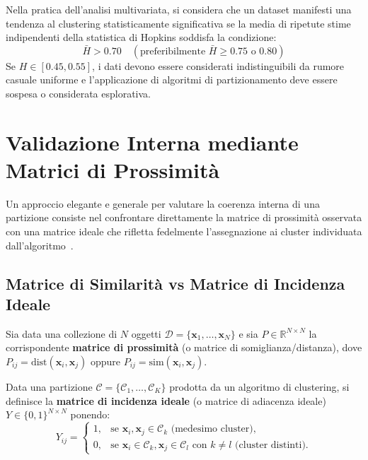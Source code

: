 \begin{remark}
Nella pratica dell'analisi multivariata, si considera che un dataset manifesti una tendenza al clustering statisticamente significativa se la media di ripetute stime indipendenti della statistica di Hopkins soddisfa la condizione:
\begin{equation}
\label{eq:dm-hopkins-threshold}
\bar{H} > 0.70 \quad (\text{preferibilmente } \bar{H} \ge 0.75 \text{ o } 0.80)
\end{equation}
Se $H \in [0.45, 0.55]$, i dati devono essere considerati indistinguibili da rumore casuale uniforme e l'applicazione di algoritmi di partizionamento deve essere sospesa o considerata esplorativa.
\end{remark}

\FloatBarrier
\section{Validazione Interna mediante Matrici di Prossimità}
\label{sec:dm-proximity-matrix-validity}

Un approccio elegante e generale per valutare la coerenza interna di una partizione consiste nel confrontare direttamente la matrice di prossimità osservata con una matrice ideale che rifletta fedelmente l'assegnazione ai cluster individuata dall'algoritmo~\cite{tan2018}.

\FloatBarrier
\subsection{Matrice di Similarità vs Matrice di Incidenza Ideale}
Sia data una collezione di $N$ oggetti $\mathcal{D} = \{\mathbf{x}_1, \dots, \mathbf{x}_N\}$ e sia $P \in \mathbb{R}^{N \times N}$ la corrispondente \textbf{matrice di prossimità} (o matrice di somiglianza/distanza), dove $P_{ij} = \mathrm{dist}(\mathbf{x}_i, \mathbf{x}_j)$ oppure $P_{ij} = \mathrm{sim}(\mathbf{x}_i, \mathbf{x}_j)$.

Data una partizione $\mathcal{C} = \{\mathcal{C}_1, \dots, \mathcal{C}_K\}$ prodotta da un algoritmo di clustering, si definisce la \textbf{matrice di incidenza ideale} (o matrice di adiacenza ideale) $Y \in \{0, 1\}^{N \times N}$ ponendo:
\begin{equation}
\label{eq:dm-ideal-matrix-def}
Y_{ij} = 
\begin{cases}
1, & \text{se } \mathbf{x}_i, \mathbf{x}_j \in \mathcal{C}_k \text{ (medesimo cluster)}, \\
0, & \text{se } \mathbf{x}_i \in \mathcal{C}_k, \mathbf{x}_j \in \mathcal{C}_l \text{ con } k \ne l \text{ (cluster distinti)}.
\end{cases}
\end{equation}

